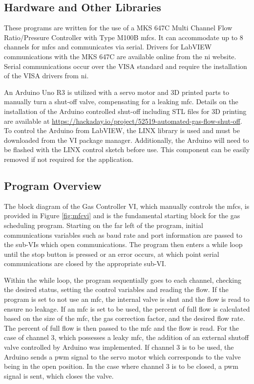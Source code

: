     \subsection{Hardware and Other Libraries}
        These programs are written for the use of a MKS 647C Multi Channel Flow Ratio/Pressure Controller with Type M100B \glspl{mfc}.
        It can accommodate up to 8 channels for \glspl{mfc} and communicates via serial.
        Drivers for LabVIEW communications with the MKS 647C are available online from the \gls{ni} website.
        Serial communications occur over the VISA standard and require the installation of the VISA drivers from \gls{ni}.

        An Arduino Uno R3 is utilized with a servo motor and 3D printed parts to manually turn a shut-off valve, compensating for a leaking \gls{mfc}.
        Details on the installation of the Arduino controlled shut-off including STL files for 3D printing are available at \href{https://hackaday.io/project/52519-automated-gas-flow-shut-off}{https://hackaday.io/project/52519-automated-gas-flow-shut-off}.
        To control the Arduino from LabVIEW, the LINX library is used and must be downloaded from the VI package manager.
        Additionally, the Arduino will need to be flashed with the LINX control sketch before use.
        This component can be easily removed if not required for the application.

    \subsection{Program Overview}
    The block diagram of the Gas Controller VI, which manually controls the \glspl{mfc}, is provided in Figure \ref{fig:mfcvi} and is the fundamental starting block for the gas scheduling program.
    Starting on the far left of the program, initial communications variables such as baud rate and port information are passed to the sub-VIs which open communications.
    The program then enters a while loop until the stop button is pressed or an error occurs, at which point serial communications are closed by the appropriate sub-VI.

    Within the while loop, the program sequentially goes to each channel, checking the desired status, setting the control variables and reading the flow.
    If the program is set to not use an \gls{mfc}, the internal valve is shut and the flow is read to ensure no leakage.
    If an \gls{mfc} is set to be used, the percent of full flow is calculated based on the size of the \gls{mfc}, the gas correction factor, and the desired flow rate.
    The percent of full flow is then passed to the \gls{mfc} and the flow is read.
    For the case of channel 3, which possesses a leaky \gls{mfc}, the addition of an external shutoff valve controlled by Arduino was implemented.
    If channel 3 is to be used, the Arduino sends a \gls{pwm} signal to the servo motor which corresponds to the valve being in the open position.
    In the case where channel 3 is to be closed, a \gls{pwm} signal is sent, which closes the valve.

